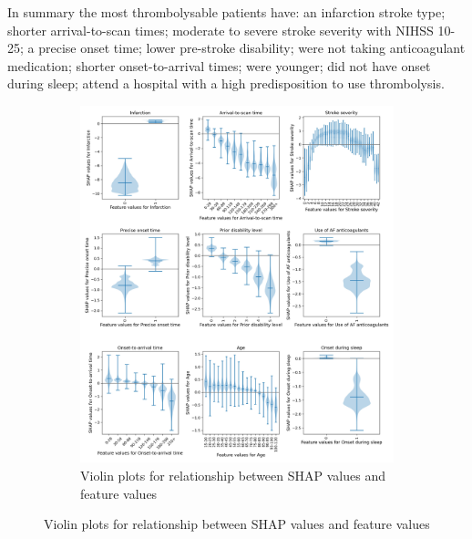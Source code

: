 In summary the most thrombolysable patients have: an infarction stroke type; shorter arrival-to-scan times; moderate to severe stroke severity with NIHSS 10-25; a precise onset time; lower pre-stroke disability; were not taking anticoagulant medication; shorter onset-to-arrival times; were younger; did not have onset during sleep; attend a hospital with a high predisposition to use thrombolysis.



\begin{figure}%
\centering
\begin{subfigure}{.9\textwidth}
  \centering
    \caption*{\footnotesize{\textsf{Violin plots for relationship between SHAP values and feature values}}}
    \includegraphics[width=1.\textwidth]{./images/03a_xgb_10_features_thrombolysis_shap_violin_all_features}
    

\end{subfigure}
\end{figure}
